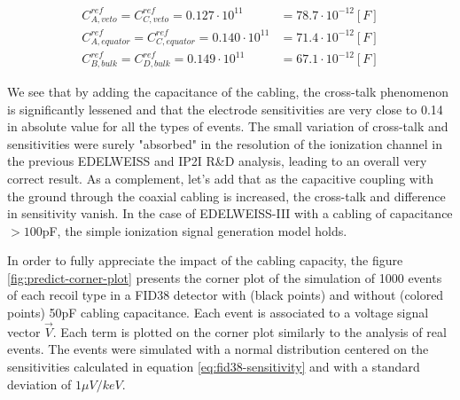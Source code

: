\begin{align}
C_{A, veto}^{ref} = C_{C, veto}^{ref}
= 0.127 \cdot 10^{11}
&= 78.7 \cdot 10^{-12} [F]
\\
C_{A, equator}^{ref} = C_{C, equator}^{ref}
= 0.140 \cdot 10^{11}
&= 71.4 \cdot 10^{-12} [F]
\\
C_{B, bulk}^{ref} = C_{D, bulk}^{ref}
= 0.149 \cdot 10^{11}
&= 67.1 \cdot 10^{-12} [F]
\end{align}

We see that by adding the capacitance of the cabling, the cross-talk phenomenon is significantly lessened and that the electrode sensitivities are very close to 0.14 in absolute value for all the types of events. The small variation of cross-talk and sensitivities were surely "absorbed" in the resolution of the ionization channel in the previous EDELWEISS and IP2I R\&D analysis, leading to an overall very correct result. As a complement, let's add that as the capacitive coupling with the ground through the coaxial cabling is increased, the cross-talk and difference in sensitivity vanish. In the case of EDELWEISS-III with a cabling of capacitance $>100$pF, the simple ionization signal generation model holds.

In order to fully appreciate the impact of the cabling capacity, the figure \ref{fig:predict-corner-plot} presents the corner plot of the simulation of 1000 events of each recoil type in a FID38 detector with (black points) and without (colored points) 50pF cabling capacitance. Each event is associated to a voltage signal vector $\vec{V}$. Each term is plotted on the corner plot similarly to the analysis of real events. The events were simulated with a normal distribution centered on the sensitivities calculated in equation \ref{eq:fid38-sensitivity} and with a standard deviation of $1\mu V/keV$.

